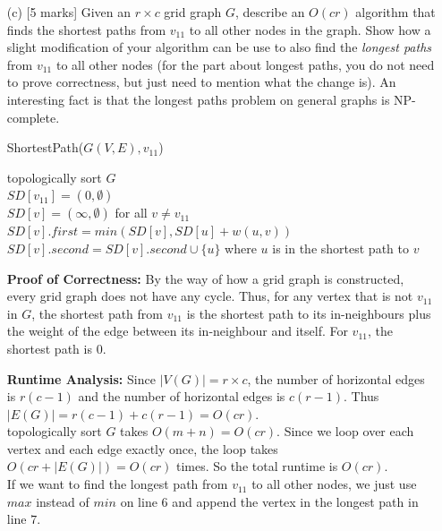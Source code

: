 \documentclass[11pt]{article}
\begin{document}
\begin{enumerate}
\begin{itemize}
\newpage
\item[(c)] [5 marks] Given an $r \times c$ grid graph $G$, describe an $O(cr)$ algorithm that finds the shortest paths from $v_{11}$ to all other nodes in the graph. Show how a slight modification of your algorithm can be use to also find the {\em longest paths} from $v_{11}$ to all other nodes (for the part about longest paths, you do not need to prove correctness, but just need to mention what the change is). An interesting fact is that the longest paths problem on general graphs is NP-complete.

\begin{algorithm}[h]
    \caption{ShortestPath($G(V, E), v_{11}$)}
    topologically sort $G$\\
    $SD[v_{11}] = (0, \emptyset)$\\
    $SD[v] = (\infty, \emptyset)$ for all $v \neq v_{11}$\\
     {
         {
            $SD[v].first = min(SD[v], SD[u] + w(u, v))$\\
        }
        $SD[v].second = SD[v].second \cup \{ u \}$ where $u$ is in the shortest path to $v$\\
    } 
\end{algorithm}

\textbf{Proof of Correctness:} By the way of how a grid graph is constructed, every grid graph does not have 
any cycle. Thus, for any vertex that is not $v_{11}$ in $G$, the shortest path from $v_{11}$ is the shortest 
path to its in-neighbours plus the weight of the edge between its in-neighbour and itself. For $v_{11}$, the 
shortest path is $0$.

\textbf{Runtime Analysis:} Since $|V(G)| = r \times c$, the number of horizontal edges is $r(c - 1)$ and 
the number of horizontal edges is $c(r - 1)$. Thus $|E(G)| = r(c - 1) + c(r - 1) = O(cr)$.\\
topologically sort $G$ takes $O(m + n) = O(cr)$. Since we loop over each vertex and each edge exactly once, 
the loop takes $O(cr + |E(G)|) = O(cr)$ times. So the total runtime is $O(cr)$.\\
If we want to find the longest path from $v_{11}$ to all other nodes, we just use $max$ instead of $min$ on 
line $6$ and append the vertex in the longest path in line $7$.

\end{itemize}


\end{enumerate}
\end{document}
